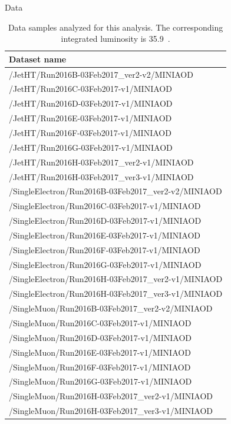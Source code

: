 \begin{section}{Data}
\begin{table}[bt!]
\begin{center}
\begin{tabular}{l}
\hline \hline
Dataset name                                        \\ 
\hline
/JetHT/Run2016B-03Feb2017\_ver2-v2/MINIAOD          \\
/JetHT/Run2016C-03Feb2017-v1/MINIAOD                \\
/JetHT/Run2016D-03Feb2017-v1/MINIAOD                \\
/JetHT/Run2016E-03Feb2017-v1/MINIAOD                \\
/JetHT/Run2016F-03Feb2017-v1/MINIAOD                \\
/JetHT/Run2016G-03Feb2017-v1/MINIAOD                \\
/JetHT/Run2016H-03Feb2017\_ver2-v1/MINIAOD          \\
/JetHT/Run2016H-03Feb2017\_ver3-v1/MINIAOD          \\
\hline
/SingleElectron/Run2016B-03Feb2017\_ver2-v2/MINIAOD \\
/SingleElectron/Run2016C-03Feb2017-v1/MINIAOD       \\
/SingleElectron/Run2016D-03Feb2017-v1/MINIAOD       \\
/SingleElectron/Run2016E-03Feb2017-v1/MINIAOD       \\
/SingleElectron/Run2016F-03Feb2017-v1/MINIAOD       \\
/SingleElectron/Run2016G-03Feb2017-v1/MINIAOD       \\
/SingleElectron/Run2016H-03Feb2017\_ver2-v1/MINIAOD \\
/SingleElectron/Run2016H-03Feb2017\_ver3-v1/MINIAOD \\
\hline
/SingleMuon/Run2016B-03Feb2017\_ver2-v2/MINIAOD     \\
/SingleMuon/Run2016C-03Feb2017-v1/MINIAOD           \\
/SingleMuon/Run2016D-03Feb2017-v1/MINIAOD           \\
/SingleMuon/Run2016E-03Feb2017-v1/MINIAOD           \\
/SingleMuon/Run2016F-03Feb2017-v1/MINIAOD           \\
/SingleMuon/Run2016G-03Feb2017-v1/MINIAOD           \\
/SingleMuon/Run2016H-03Feb2017\_ver2-v1/MINIAOD     \\
/SingleMuon/Run2016H-03Feb2017\_ver3-v1/MINIAOD     \\
\hline \hline
\end{tabular}
\caption{Data samples analyzed for this analysis.
The corresponding integrated luminosity is 35.9~\ifb.}
\label{tab:data_samples}
\end{center}
\end{table}

\end{section}

